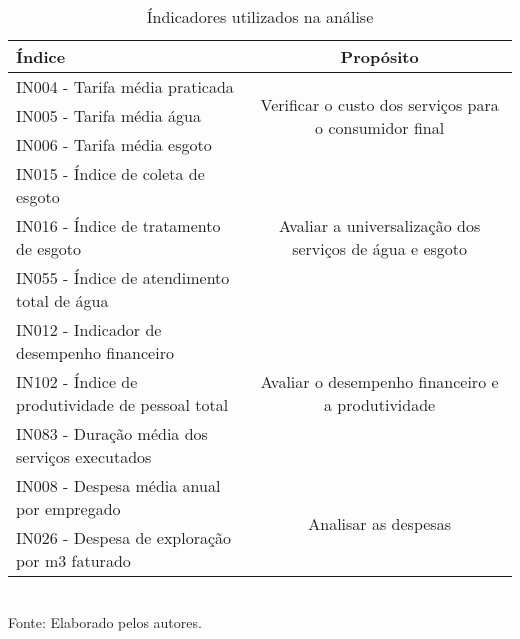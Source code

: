 

\begin{table}[H]\centering
\begin{minipage}{0.9\textwidth}
	\caption{Índicadores utilizados na análise}
	\label{tab:ind}
	\begin{tabular}{l|c}
		\toprule
		\toprule
			Índice & Propósito  \\
			
		\midrule
				IN004 - Tarifa média praticada  &  \multirow{3}{*}{\parbox{6cm}{Verificar o custo dos serviços para o consumidor final}} \\
				IN005 - Tarifa média água       &  \\
				IN006 - Tarifa média esgoto	   &   \\
					                                
		\midrule
				IN015 - Índice de coleta de esgoto & \multirow{3}{*}{\parbox{6cm}{Avaliar a universalização dos serviços de água e esgoto}} \\
				IN016 - Índice de tratamento de esgoto & \\
				IN055 - Índice de atendimento total de água	& \\
													
		\midrule
		
		IN012 - Indicador de desempenho financeiro & \multirow{3}{*}{\parbox{6cm}{Avaliar o desempenho financeiro e a produtividade}} \\
		IN102 - Índice de produtividade de pessoal total & \\		
		IN083 - Duração média dos serviços executados & \\
				
		\midrule
		
		IN008 - Despesa média anual por empregado & \multirow{2}{*}{\parbox{6cm}{Analisar as despesas}} \\
		IN026 - Despesa de exploração por m3 faturado & \\	
		
		\bottomrule
		
	\end{tabular}
\footnotesize \\
	Fonte: Elaborado pelos autores.
\end{minipage}
\end{table}